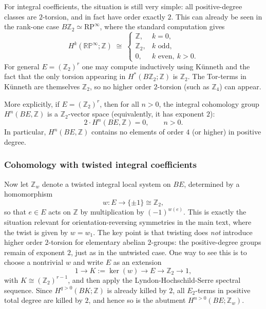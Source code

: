\documentclass[aps,prx,reprint,superscriptaddress,twocolumn,amsmath,amssymb,amsfonts, nofootinbib]{revtex4-2}
\newcommand{\Z}{\mathbb{Z}}
\theoremstyle{apsstyle}
\begin{document}
For integral coefficients, the situation is still very simple: all positive-degree classes are $2$-torsion, and in fact have order exactly $2$. This can already be seen in the rank-one case
$B\Z_{2}\simeq \mathrm{RP}^{\infty}$, where the standard computation gives
\begin{equation*}
    H^{k}(\mathbb{RP}^{\infty};\Z)
    \;\cong\;
    \begin{cases}
        \Z, & k=0,\\
        \Z_{2}, & k \text{ odd},\\
        0, & k \text{ even},\ k>0.
    \end{cases}
\end{equation*}
For general $E=(\Z_{2})^{r}$ one may compute inductively using K\"unneth and the fact that the only torsion appearing in $H^{*}(B\Z_{2};\Z)$ is $\Z_{2}$. The Tor-terms in K\"unneth are themselves $\Z_{2}$, so no higher order $2$-torsion (such as $\Z_{4}$) can appear.

\bigskip

\noindent More explicitly, if $E=(\Z_{2})^{r}$, then for all $n>0$, the integral cohomology group $H^{n}(BE,\Z)$ is a $\Z_{2}$-vector space (equivalently, it has exponent $2$):
\begin{equation}
\label{eq:elem_Z}
    2\cdot H^{n}(BE,\Z)=0,\qquad n>0.
\end{equation}
In particular, $H^{n}(BE,\Z)$ contains no elements of order $4$ (or higher) in positive degree.


\subsubsection{Cohomology with twisted integral coefficients}
\label{app:elem_twisted}

Now let $\Z_{w}$ denote a twisted integral local system on $BE$, determined by a homomorphism
\begin{equation*}
    w:E \longrightarrow \{\pm 1\}\cong \Z_{2},
\end{equation*}
so that $e\in E$ acts on $\Z$ by multiplication by $(-1)^{w(e)}$.
This is exactly the situation relevant for orientation-reversing symmetries in the main text, where the twist is given by $w=w_{1}$. The key point is that twisting does \emph{not} introduce higher order $2$-torsion for elementary abelian $2$-groups: the positive-degree groups remain of exponent $2$, just as in the untwisted case. One way to see this is to choose a nontrivial $w$ and write $E$ as an extension
\begin{equation*}
    1 \longrightarrow K:=\ker(w) \longrightarrow E \longrightarrow \Z_{2} \longrightarrow 1,
\end{equation*}
with $K\cong (\Z_{2})^{r-1}$, and then apply the Lyndon-Hochschild-Serre spectral sequence. Since $H^{q>0}(BK;\Z)$ is already killed by $2$, all $E_{2}$-terms in positive total degree are killed by $2$, and hence so is the abutment $H^{n>0}(BE;\Z_{w})$.
\end{document}
